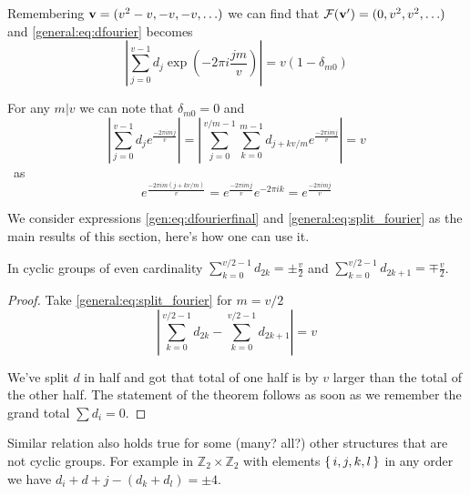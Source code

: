         Remembering ${\bf v} = (v^2-v, -v, -v, \ldots)$ we can find that $\mathcal{F}({\bf v'}) = (0,v^2,v^2,\ldots)$ and \eqref{general:eq:dfourier} becomes
        \begin{equation}
            \label{gen:eq:dfourierfinal}
            \left| \sum_{j=0}^{v-1} d_j \exp(-2\pi i \frac{jm}v) \right| = v (1-\delta_{m0})
        \end{equation}

        For any $m | v$ we can note that $\delta_{m0}=0$ and
        \begin{equation}
            \label{general:eq:split_fourier}
            \left| \sum_{j=0}^{v-1} d_j e^{\frac{-2\pi i m j}v} \right|
            = \left| \sum_{j=0}^{v/m-1} \sum_{k=0}^{m-1}  d_{j+kv/m} e^{\frac{-2\pi i m j}v} \right|
            =v
        \end{equation}\
        as 
        \begin{equation}
            e^{\frac{-2\pi i m (j+kv/m)}v} = e^{\frac{-2\pi i m j}v} e^{-2\pi i k} = e^{\frac{-2\pi i m j}v}
        \end{equation}
        
        We consider expressions \eqref{gen:eq:dfourierfinal} and \eqref{general:eq:split_fourier} as the main results of this section, here's how one can use it.
        
        \begin{proposition}
            \label{general:theorem:even_cyclic}
            In cyclic groups of even cardinality $\sum_{k=0}^{v/2-1} d_{2k} = \pm \frac v2$ and $\sum_{k=0}^{v/2-1} d_{2k+1} = \mp \frac v2$.
        \end{proposition}
        \begin{proof}
            Take \eqref{general:eq:split_fourier} for $m=v/2$
            \begin{equation}
                \left| \sum_{k=0}^{v/2-1} d_{2k} - \sum_{k=0}^{v/2-1} d_{2k+1} \right| = v
            \end{equation}
            
            We've split $d$ in half and got that total of one half is by $v$ larger than the total of the other half. The statement of the theorem follows as soon as we remember the grand total $\sum d_i = 0$.
        \end{proof}
        
        \begin{remark}
            Similar relation also holds true for some (many? all?) other structures that are not cyclic groups. For example in $\mathbb Z_2 \times \mathbb Z_2$ with elements $\set{i,j,k,l}$ in any order we have $d_i+d+j-(d_k+d_l)=\pm 4$.
        \end{remark}


